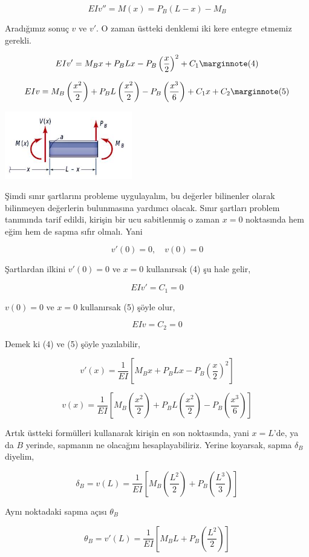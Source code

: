 \documentclass[12pt,fleqn]{article}\usepackage{../../common}
\begin{document}
$$
EIv'' = M(x) = P_B(L-x) - M_B
$$

Aradığımız sonuç $v$ ve $v'$. O zaman üstteki denklemi iki kere entegre etmemiz
gerekli.

$$
EI v' = M_B x + P_B Lx - P_B \left( \frac{x}{2} \right)^2 + C_1
\mlabel{4}
$$

$$
EIv = M_B \left( \frac{x^2}{2} \right) +
P_B L  \left( \frac{x^2}{2} \right) -
P_B \left( \frac{x^3}{6} \right) +
C_1 x + C_2
\mlabel{5}
$$

\includegraphics[width=15em]{phy_020_strs_05_05.jpg}

Şimdi sınır şartlarını probleme uygulayalım, bu değerler bilinenler
olarak bilinmeyen değerlerin bulunmasına yardımcı olacak. Sınır şartları
problem tanımında tarif edildi, kirişin bir ucu sabitlenmiş o zaman
$x=0$ noktasında hem eğim hem de sapma sıfır olmalı. Yani

$$
v'(0) = 0,\quad v(0) = 0
$$

Şartlardan ilkini $v'(0)=0$ ve $x=0$ kullanırsak (4) şu hale gelir,

$$
EI v' = C_1 = 0
$$

$v(0)=0$ ve $x=0$ kullanırsak (5) şöyle olur,

$$
EIv = C_2 = 0
$$

Demek ki (4) ve (5) şöyle yazılabilir,

$$
v'(x) = \frac{1}{EI} \left[
  M_B x + P_B Lx - P_B \left( \frac{x}{2} \right)^2
\right]
$$

$$
v(x) = \frac{1}{EI} \left[
  M_B \left( \frac{x^2}{2} \right) + 
  P_B L  \left( \frac{x^2}{2} \right) -
  P_B \left( \frac{x^3}{6} \right)
\right]
$$

Artık üstteki formülleri kullanarak kirişin en son noktasında, yani $x=L$'de, ya
da $B$ yerinde, sapmanın ne olacağını hesaplayabiliriz. Yerine koyarsak, sapma
$\delta_B$ diyelim,

$$
\delta_B = v(L) =
\frac{1}{EI} \left[
M_B \left( \frac{L^2}{2}  \right) +
P_B \left( \frac{L^3}{3}  \right)
\right]
$$

Aynı noktadaki sapma açısı $\theta_B$

$$
\theta_B = v'(L) =
\frac{1}{EI} \left[
M_B L + P_B \left( \frac{L^2}{2} \right) 
\right]
$$
\end{document}
